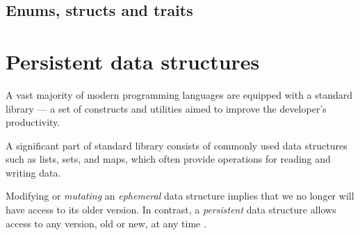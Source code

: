 


\subsection{Enums, structs and traits}

\section{Persistent data structures}
\label{sec:psds}

A vast majority of modern programming languages are equipped with a standard library --- a set of constructs and utilities aimed to improve the developer's productivity.

A significant part of standard library consists of commonly used data structures such as lists, sets, and maps, which often provide operations for reading and writing data.

Modifying or \emph{mutating} an \emph{ephemeral} data structure implies that we no longer will have access to its older version. In contrast, a \emph{persistent} data structure allows access to any version, old or new, at any time \cite{making-data-structures-persistent}.

